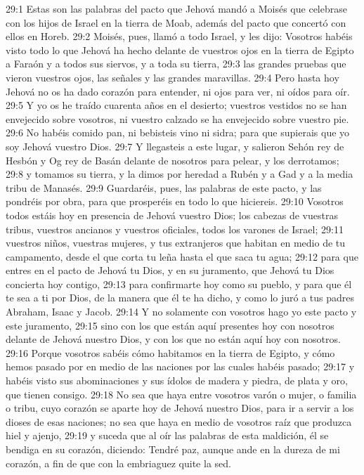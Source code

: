29:1 Estas son las palabras del pacto que Jehová mandó a Moisés que celebrase con los hijos de Israel en la tierra de Moab, además del pacto que concertó con ellos en Horeb.  
29:2 Moisés, pues, llamó a todo Israel, y les dijo: Vosotros habéis visto todo lo que Jehová ha hecho delante de vuestros ojos en la tierra de Egipto a Faraón y a todos sus siervos, y a toda su tierra, 
29:3 las grandes pruebas que vieron vuestros ojos, las señales y las grandes maravillas.  
29:4 Pero hasta hoy Jehová no os ha dado corazón para entender, ni ojos para ver, ni oídos para oír.  
29:5 Y yo os he traído cuarenta años en el desierto; vuestros vestidos no se han envejecido sobre vosotros, ni vuestro calzado se ha envejecido sobre vuestro pie.  
29:6 No habéis comido pan, ni bebisteis vino ni sidra; para que supierais que yo soy Jehová vuestro Dios.  
29:7 Y llegasteis a este lugar, y salieron Sehón rey de Hesbón y Og rey de Basán delante de nosotros para pelear, y los derrotamos;  
29:8 y tomamos su tierra, y la dimos por heredad a Rubén y a Gad y a la media tribu de Manasés. 
29:9 Guardaréis, pues, las palabras de este pacto, y las pondréis por obra, para que prosperéis en todo lo que hiciereis.  
29:10 Vosotros todos estáis hoy en presencia de Jehová vuestro Dios; los cabezas de vuestras tribus, vuestros ancianos y vuestros oficiales, todos los varones de Israel;  
29:11 vuestros niños, vuestras mujeres, y tus extranjeros que habitan en medio de tu campamento, desde el que corta tu leña hasta el que saca tu agua;  
29:12 para que entres en el pacto de Jehová tu Dios, y en su juramento, que Jehová tu Dios concierta hoy contigo,  
29:13 para confirmarte hoy como su pueblo, y para que él te sea a ti por Dios, de la manera que él te ha dicho, y como lo juró a tus padres Abraham, Isaac y Jacob.  
29:14 Y no solamente con vosotros hago yo este pacto y este juramento,  
29:15 sino con los que están aquí presentes hoy con nosotros delante de Jehová nuestro Dios, y con los que no están aquí hoy con nosotros.  
29:16 Porque vosotros sabéis cómo habitamos en la tierra de Egipto, y cómo hemos pasado por en medio de las naciones por las cuales habéis pasado; 
29:17 y habéis visto sus abominaciones y sus ídolos de madera y piedra, de plata y oro, que tienen consigo.  
29:18 No sea que haya entre vosotros varón o mujer, o familia o tribu, cuyo corazón se aparte hoy de Jehová nuestro Dios, para ir a servir a los dioses de esas naciones; no sea que haya en medio de vosotros raíz que produzca hiel y ajenjo, 
29:19 y suceda que al oír las palabras de esta maldición, él se bendiga en su corazón, diciendo: Tendré paz, aunque ande en la dureza de mi corazón, a fin de que con la embriaguez quite la sed.  
